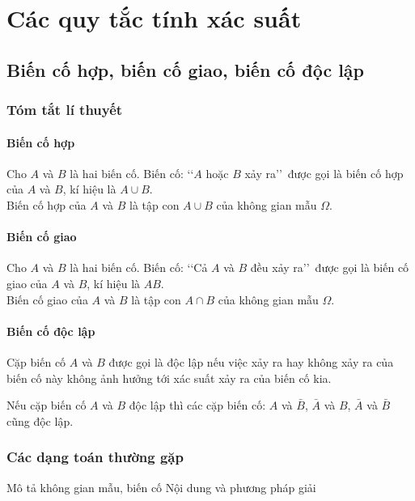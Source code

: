 \chapter{Các quy tắc tính xác suất}
\section{Biến cố hợp, biến cố giao, biến cố độc lập}
\subsection{Tóm tắt lí thuyết}
\begin{tomtat}
	\subsubsection{Biến cố hợp}
	\begin{dn}
		Cho $A$ và $B$ là hai biến cố. Biến cố: \lq\lq  $A$ hoặc $B$ xảy ra\rq\rq\ được gọi là biến cố hợp của $A$ và $B$, kí hiệu là $A \cup B$.\\
		Biến cố hợp của $A$ và $B$ là tập con $A \cup B$ của không gian mẫu $\Omega$.
	\end{dn}
	\subsubsection{Biến cố giao}
	\begin{dn}
		Cho $A$ và $B$ là hai biến cố. Biến cố: \lq\lq  Cả $A$ và $B$ đều xảy ra\rq\rq\ được gọi là biến cố giao của $A$ và $B$, kí hiệu là $A B$.\\
		Biến cố giao của $A$ và $B$ là tập con $A \cap B$ của không gian mẫu $\Omega$.
	\end{dn}
	\subsubsection{Biến cố độc lập}
	\begin{dn}
		Cặp biến cố $A$ và $B$ được gọi là độc lập nếu việc xảy ra hay không xảy ra của biến cố này không ảnh hưởng tới xác suất xảy ra của biến cố kia. 
	\end{dn}
	\begin{note}
		Nếu cặp biến cố $A$ và $B$ độc lập thì các cặp biến cố: $A$ và $\bar{B}$, $\bar{A}$ và $B$, $\bar{A}$ và $\bar{B}$ cũng độc lập.
	\end{note}
\end{tomtat}
\subsection{Các dạng toán thường gặp}
\begin{dang}{Mô tả không gian mẫu, biến cố}
	Nội dung và phương pháp giải
\end{dang}

